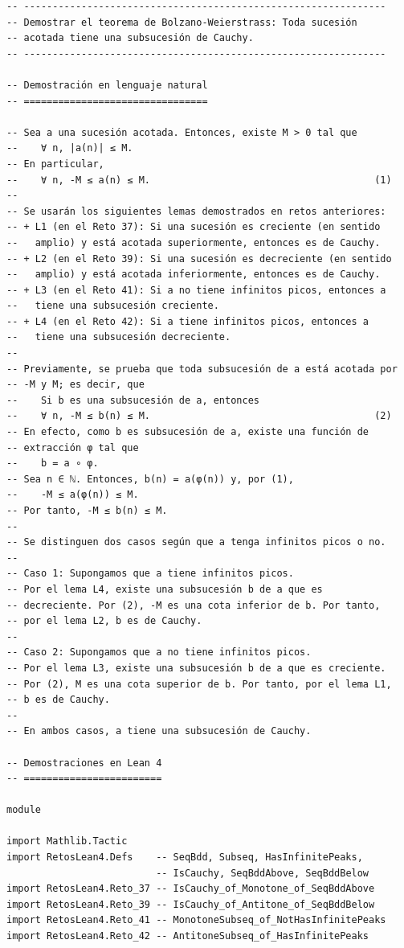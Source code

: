\begin{verbatim}
-- ---------------------------------------------------------------
-- Demostrar el teorema de Bolzano-Weierstrass: Toda sucesión
-- acotada tiene una subsucesión de Cauchy.
-- ---------------------------------------------------------------

-- Demostración en lenguaje natural
-- ================================

-- Sea a una sucesión acotada. Entonces, existe M > 0 tal que
--    ∀ n, |a(n)| ≤ M.
-- En particular,
--    ∀ n, -M ≤ a(n) ≤ M.                                       (1)
--
-- Se usarán los siguientes lemas demostrados en retos anteriores:
-- + L1 (en el Reto 37): Si una sucesión es creciente (en sentido
--   amplio) y está acotada superiormente, entonces es de Cauchy.
-- + L2 (en el Reto 39): Si una sucesión es decreciente (en sentido
--   amplio) y está acotada inferiormente, entonces es de Cauchy.
-- + L3 (en el Reto 41): Si a no tiene infinitos picos, entonces a
--   tiene una subsucesión creciente.
-- + L4 (en el Reto 42): Si a tiene infinitos picos, entonces a
--   tiene una subsucesión decreciente.
--
-- Previamente, se prueba que toda subsucesión de a está acotada por
-- -M y M; es decir, que
--    Si b es una subsucesión de a, entonces
--    ∀ n, -M ≤ b(n) ≤ M.                                       (2)
-- En efecto, como b es subsucesión de a, existe una función de
-- extracción φ tal que
--    b = a ∘ φ.
-- Sea n ∈ ℕ. Entonces, b(n) = a(φ(n)) y, por (1),
--    -M ≤ a(φ(n)) ≤ M.
-- Por tanto, -M ≤ b(n) ≤ M.
--
-- Se distinguen dos casos según que a tenga infinitos picos o no.
--
-- Caso 1: Supongamos que a tiene infinitos picos.
-- Por el lema L4, existe una subsucesión b de a que es
-- decreciente. Por (2), -M es una cota inferior de b. Por tanto,
-- por el lema L2, b es de Cauchy.
--
-- Caso 2: Supongamos que a no tiene infinitos picos.
-- Por el lema L3, existe una subsucesión b de a que es creciente.
-- Por (2), M es una cota superior de b. Por tanto, por el lema L1,
-- b es de Cauchy.
--
-- En ambos casos, a tiene una subsucesión de Cauchy.

-- Demostraciones en Lean 4
-- ========================

module

import Mathlib.Tactic
import RetosLean4.Defs    -- SeqBdd, Subseq, HasInfinitePeaks,
                          -- IsCauchy, SeqBddAbove, SeqBddBelow
import RetosLean4.Reto_37 -- IsCauchy_of_Monotone_of_SeqBddAbove
import RetosLean4.Reto_39 -- IsCauchy_of_Antitone_of_SeqBddBelow
import RetosLean4.Reto_41 -- MonotoneSubseq_of_NotHasInfinitePeaks
import RetosLean4.Reto_42 -- AntitoneSubseq_of_HasInfinitePeaks


\end{verbatim}
